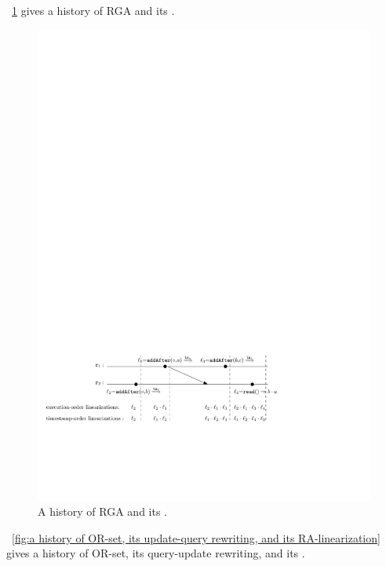 


\figurename~\ref{fig:a history of RGA and its RA-linearization} gives a history of RGA and its \crdtlinearization{}.

\begin{figure}[t]
  \centering
  \includegraphics[width=0.6 \textwidth]{figures/RGAHisandLin.pdf}
\vspace{-10pt}
  \caption{A history of RGA and its \crdtlinearization{}.}
  \label{fig:a history of RGA and its RA-linearization}
\end{figure}


\figurename~\ref{fig:a history of OR-set, its update-query rewriting, and its RA-linearization} gives a history of OR-set, its query-update rewriting, and its \crdtlinearization{}.

